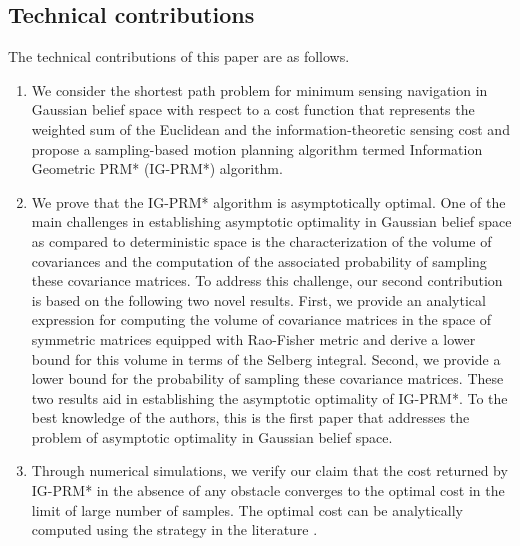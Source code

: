 \documentclass[Afour,sageh,times]{sagej}
\begin{document}
\subsection{Technical contributions}
The technical contributions of this paper are as follows.
\begin{enumerate}
    \item We consider the shortest path problem for minimum sensing navigation in Gaussian belief space with respect to a cost function that represents the weighted sum of the Euclidean and the information-theoretic sensing cost and propose a sampling-based motion planning algorithm termed Information Geometric PRM* (IG-PRM*) algorithm. 
    \item We prove that the IG-PRM* algorithm is asymptotically optimal. One of the main challenges in establishing asymptotic optimality in Gaussian belief space as compared to deterministic space is the characterization of the volume of covariances and the computation of the associated probability of sampling these covariance matrices. To address this challenge, our second contribution is based on the following two novel results. First, we provide an analytical expression for computing the volume of covariance matrices in the space of symmetric matrices equipped with Rao-Fisher metric and derive a lower bound for this volume in terms of the Selberg integral. Second, we provide a lower bound for the probability of sampling these covariance matrices. These two results aid in establishing the asymptotic optimality of IG-PRM*.
    To the best knowledge of the authors, this is the first paper that addresses the problem of asymptotic optimality in Gaussian belief space.
    \item Through numerical simulations, we verify our claim that the cost returned by IG-PRM* in the absence of any obstacle converges to the optimal cost in the limit of large number of samples. The optimal cost can be analytically computed using the  strategy in the literature \cite{pedram2021gaussian}.
\end{enumerate}
\end{document}

